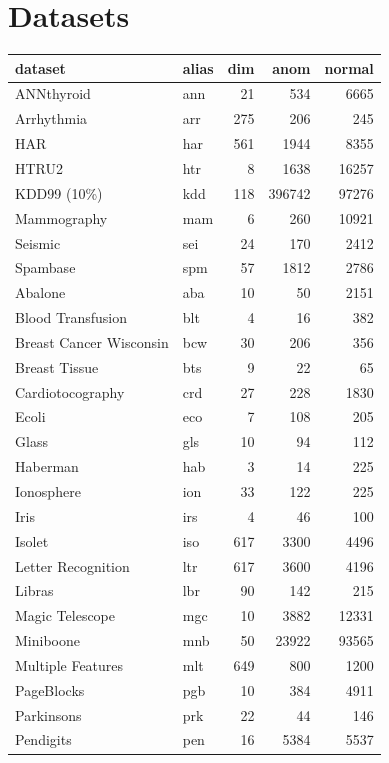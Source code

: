 \chapter{Datasets}\label{sec:datasets}

\begin{table}
\centering
\tabcolsep=0.1cm
\begin{tabular}{llrrr}
\toprule
\textbf{dataset} & \textbf{alias} & \textbf{dim} & \textbf{anom} & \textbf{normal}   \\\midrule
ANNthyroid & ann  & 21 & 534 & 6665 \\
Arrhythmia & arr  & 275 & 206 & 245 \\
HAR & har & 561 & 1944 & 8355  \\
HTRU2 & htr & 8 & 1638 & 16257  \\
KDD99 (10\%) & kdd & 118 & 396742 & 97276  \\
Mammography & mam & 6 & 260 & 10921  \\
Seismic & sei  & 24 & 170 & 2412  \\
Spambase & spm & 57 & 1812 & 2786  \\
\midrule
Abalone & aba & 10 & 50 & 2151  \\
Blood Transfusion & blt & 4 & 16 & 382  \\
Breast Cancer Wisconsin & bcw  & 30 & 206 & 356 \\
Breast Tissue & bts & 9 & 22 & 65 \\
Cardiotocography & crd & 27 & 228 & 1830  \\
Ecoli & eco & 7 & 108 & 205  \\
Glass & gls & 10 & 94 & 112  \\
Haberman & hab & 3 & 14 & 225  \\
Ionosphere & ion & 33 & 122 & 225  \\
Iris & irs & 4 & 46 & 100  \\
Isolet & iso & 617 & 3300 & 4496  \\
Letter Recognition & ltr & 617 & 3600 & 4196  \\
Libras & lbr & 90 & 142 & 215  \\
Magic Telescope & mgc & 10 & 3882 & 12331  \\
Miniboone & mnb & 50 & 23922 & 93565  \\
Multiple Features & mlt & 649 & 800 & 1200  \\
PageBlocks & pgb & 10 & 384 & 4911  \\
Parkinsons & prk & 22 & 44 & 146  \\
Pendigits & pen & 16 & 5384 & 5537  \\

\end{tabular}
\end{table}
